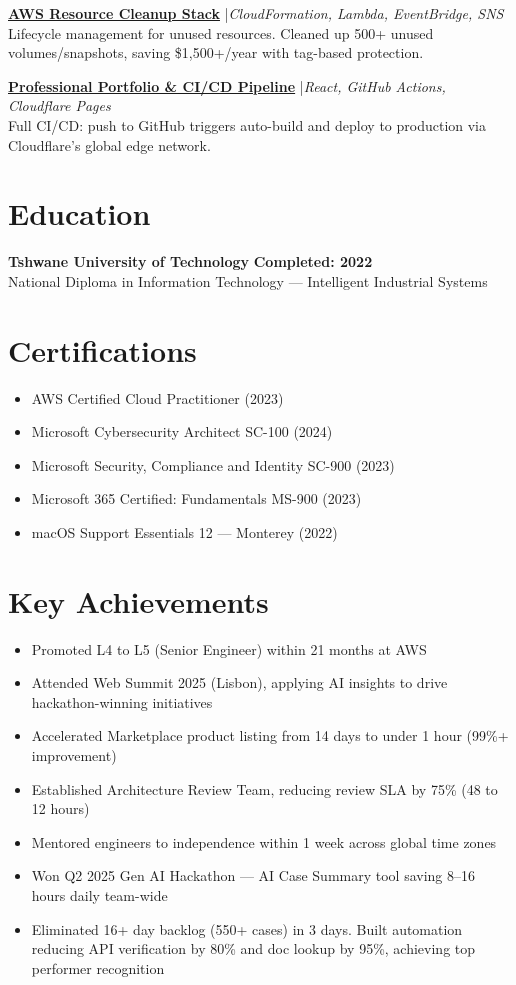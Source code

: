 \documentclass[11pt,a4paper]{article}
\begin{document}
\href{https://github.com/mamathebula/aws-resource-cleanup}{\color{linkblue}\textbf{AWS Resource Cleanup Stack}} \enspace|\enspace \textit{CloudFormation, Lambda, EventBridge, SNS}\\
Lifecycle management for unused resources. Cleaned up 500+ unused volumes/snapshots, saving \$1,500+/year with tag-based protection.


\href{https://applyza.co.za/resume_mandla/}{\color{linkblue}\textbf{Professional Portfolio \& CI/CD Pipeline}} \enspace|\enspace \textit{React, GitHub Actions, Cloudflare Pages}\\
Full CI/CD: push to GitHub triggers auto-build and deploy to production via Cloudflare's global edge network.

\section{Education}
\textbf{Tshwane University of Technology} \hfill \textbf{Completed: 2022}\\
National Diploma in Information Technology --- Intelligent Industrial Systems

\section{Certifications}
\begin{itemize}
  \item AWS Certified Cloud Practitioner (2023)
  \item Microsoft Cybersecurity Architect SC-100 (2024)
  \item Microsoft Security, Compliance and Identity SC-900 (2023)
  \item Microsoft 365 Certified: Fundamentals MS-900 (2023)
  \item macOS Support Essentials 12 --- Monterey (2022)
\end{itemize}

\section{Key Achievements}
\begin{itemize}
  \item Promoted L4 to L5 (Senior Engineer) within 21 months at AWS
  \item Attended Web Summit 2025 (Lisbon), applying AI insights to drive hackathon-winning initiatives
  \item Accelerated Marketplace product listing from 14 days to under 1 hour (99\%+ improvement)
  \item Established Architecture Review Team, reducing review SLA by 75\% (48 to 12 hours)
  \item Mentored engineers to independence within 1 week across global time zones
  \item Won Q2 2025 Gen AI Hackathon --- AI Case Summary tool saving 8--16 hours daily team-wide
  \item Eliminated 16+ day backlog (550+ cases) in 3 days. Built automation reducing API verification by 80\% and doc lookup by 95\%, achieving top performer recognition
\end{itemize}
\end{document}
